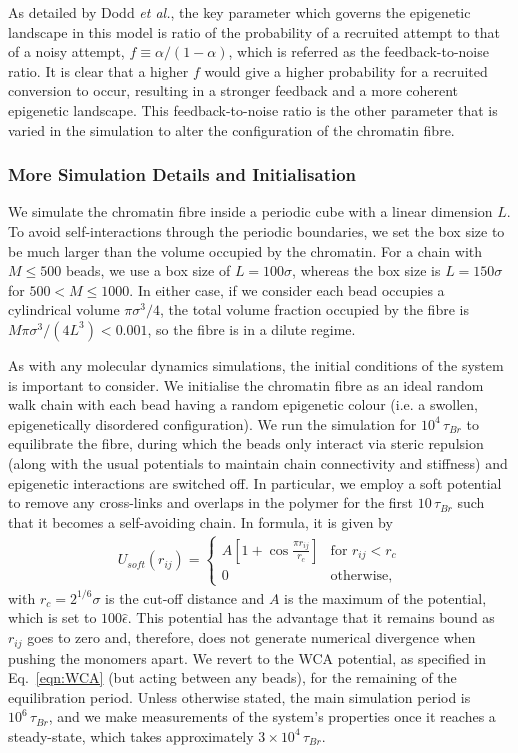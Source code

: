 \documentclass[12pt]{article}
\newcommand{\etal}{\emph{et al.}}
\begin{document}
As detailed by Dodd \etal, the key parameter which governs the epigenetic landscape in this model is ratio of the probability of a recruited attempt to that of a noisy attempt, $f \equiv \alpha / (1-\alpha)$, which is referred as the feedback-to-noise ratio. It is clear that a higher $f$ would give a higher probability for a recruited conversion to occur, resulting in a stronger feedback and a more coherent epigenetic landscape. This feedback-to-noise ratio is the other parameter that is varied in the simulation to alter the configuration of the chromatin fibre. 

\subsubsection{More Simulation Details and Initialisation}
We simulate the chromatin fibre inside a periodic cube with a linear dimension $L$. To avoid self-interactions through the periodic boundaries, we set the box size to be much larger than the volume occupied by the chromatin. For a chain with $M \le 500$ beads, we use a box size of $L = 100\sigma$, whereas the box size is $L = 150\sigma$ for $500 < M \le 1000$. In either case, if we consider each bead occupies a cylindrical volume $\pi\sigma^3/4$, the total volume fraction occupied by the fibre is $M\pi\sigma^3/(4L^3) < 0.001$, so the fibre is in a dilute regime.

As with any molecular dynamics simulations, the initial conditions of the system is important to consider. We initialise the chromatin fibre as an ideal random walk chain with each bead having a random epigenetic colour (i.e. a swollen, epigenetically disordered configuration). We run the simulation for $10^4\,\tau_{Br}$ to equilibrate the fibre, during which the beads only interact via steric repulsion (along with the usual potentials to maintain chain connectivity and stiffness) and epigenetic interactions are switched off. In particular, we employ a soft potential to remove any cross-links and overlaps in the polymer for the first $10\,\tau_{Br}$ such that it becomes a self-avoiding chain. In formula, it is given by
\begin{eqnarray}
U_{soft}(r_{ij}) = \left\{ 
	\begin{array}{ll}
		A\left[1+\cos\frac{\pi r_{ij}}{r_c}\right] & \textrm{for $r_{ij} < r_c$}\\
		0 & \textrm{otherwise},
	\end{array}
	\right.
\end{eqnarray}
with $r_c = 2^{1/6}\sigma$ is the cut-off distance and $A$ is the maximum of the potential, which is set to $100\hat{\epsilon}$. This potential has the advantage that it remains bound as $r_{ij}$ goes to zero and, therefore, does not generate numerical divergence when pushing the monomers apart. We revert to the WCA potential, as specified in Eq.~\ref{eqn:WCA} (but acting between any beads), for the remaining of the equilibration period. Unless otherwise stated, the main simulation period is $10^6\,\tau_{Br}$, and we make measurements of the system's properties once it reaches a steady-state, which takes approximately $3\times10^4\,\tau_{Br}$.
\end{document}
